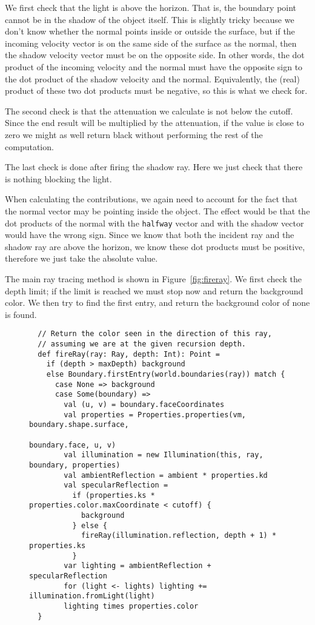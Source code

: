 We first check that the light is above the horizon.
That is, the boundary point cannot be in the shadow of the object itself.
This is slightly tricky because we don't know whether the normal
points inside or outside the surface,
but if the incoming velocity vector
is on the same side of the surface as the normal,
then the shadow velocity vector must be on the opposite side.
In other words,
the dot product of the incoming velocity and the normal
must have the opposite sign to
the dot product of the shadow velocity and the normal.
Equivalently,
the (real) product of these two dot products must be negative,
so this is what we check for.

The second check is that the attenuation we calculate is not below the cutoff.
Since the end result will be multiplied by the attenuation,
if the value is close to zero we might as well return black
without performing the rest of the computation.

The last check is done after firing the shadow ray.
Here we just check that there is nothing blocking the light.

When calculating the contributions,
we again need to account for the fact that the normal vector
may be pointing inside the object.
The effect would be that the dot products of the normal with
the \verb!halfway! vector and with the shadow vector
would have the wrong sign.
Since we know that both the incident ray and the shadow ray
are above the horizon,
we know these dot products must be positive,
therefore we just take the absolute value.

The main ray tracing method is shown in Figure~\ref{fig:fireray}.
We first check the depth limit;
if the limit is reached we must stop now and return the background color.
We then try to find the first entry,
and return the background color of none is found.

\begin{figure}
\begin{verbatim}
  // Return the color seen in the direction of this ray,
  // assuming we are at the given recursion depth.
  def fireRay(ray: Ray, depth: Int): Point =
    if (depth > maxDepth) background
    else Boundary.firstEntry(world.boundaries(ray)) match {
      case None => background
      case Some(boundary) =>
        val (u, v) = boundary.faceCoordinates
        val properties = Properties.properties(vm, boundary.shape.surface,
                                               boundary.face, u, v)
        val illumination = new Illumination(this, ray, boundary, properties)
        val ambientReflection = ambient * properties.kd
        val specularReflection =
          if (properties.ks * properties.color.maxCoordinate < cutoff) {
            background
          } else {
            fireRay(illumination.reflection, depth + 1) * properties.ks
          }
        var lighting = ambientReflection + specularReflection
        for (light <- lights) lighting += illumination.fromLight(light)
        lighting times properties.color
  }
\end{verbatim}
\getcaption
\end{figure}

